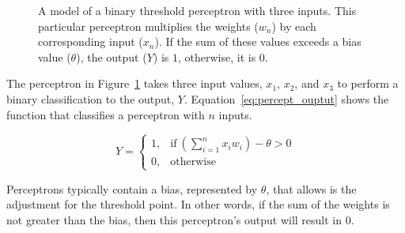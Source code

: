 \begin{figure}[ht]
\centering
{}
\caption[Diagram of Three Input Perceptron]{A model of a binary threshold perceptron with three inputs. This particular perceptron multiplies the weights ($w_n$) by each corresponding input ($x_n$). If the sum of these values exceeds a bias value ($\theta$), the output ($Y$) is $1$, otherwise, it is $0$.}
\label{fig:preceptron_example}
\end{figure}

The perceptron in Figure~\ref{fig:preceptron_example} takes three input values, $x_1$, $x_2$, and $x_3$ to perform a binary classification to the output, $Y$. Equation~\ref{eq:percept_ouptut} shows the function that classifies a perceptron with $n$ inputs.

\begin{equation} \label{eq:percept_ouptut}
Y = 
    \begin{cases}
        1, & \text{if}\ (\sum\limits_{i=1}^n  x_i  w_i) - \theta > 0\\
        0, & \text{otherwise}
    \end{cases}
\end{equation}

Perceptrons typically contain a bias, represented by $\theta$, that allows is the adjustment for the threshold point. In other words, if the sum of the weights is not greater than the bias, then this perceptron's output will result in 0. 

